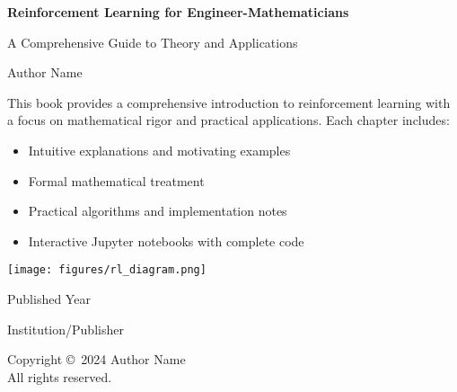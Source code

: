 \documentclass[11pt,twoside,openright]{book}
\theoremstyle{definition}
\begin{document}
\frontmatter

\begin{titlepage}
    \centering
    \vspace*{2cm}
    
    {\Huge\bfseries Reinforcement Learning for Engineer-Mathematicians\par}
    \vspace{1.5cm}
    {\Large A Comprehensive Guide to Theory and Applications\par}
    \vspace{2cm}
    
    {\Large Author Name\par}
    \vspace{1cm}
    
    \vspace{2cm}
    \begin{tcolorbox}[colback=blue!5,colframe=blue!40!black,title=About This Book]
    This book provides a comprehensive introduction to reinforcement learning with a focus on mathematical rigor and practical applications. Each chapter includes:
    \begin{itemize}
        \item Intuitive explanations and motivating examples
        \item Formal mathematical treatment
        \item Practical algorithms and implementation notes
        \item Interactive Jupyter notebooks with complete code
    \end{itemize}
    \end{tcolorbox}
    
    \texttt{[image: figures/rl\_diagram.png]}
    \vspace{1cm}
    
    {\large Published Year\par}
    \vfill
    
    {\large Institution/Publisher\par}
\end{titlepage}

\newpage
\thispagestyle{empty}
\vspace*{\fill}
\begin{center}
Copyright \copyright\ 2024 Author Name\\
All rights reserved.
\end{center}
\vspace*{\fill}
\end{document}

